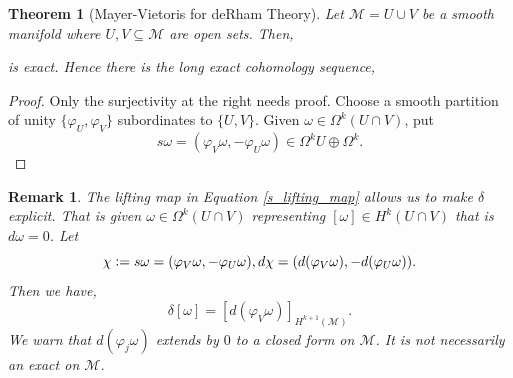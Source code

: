 \documentclass[8pt]{article}
\newtheorem{theorem}{Theorem} [section]
\newtheorem{remark}{Remark}[section]
\newcommand{\defeq}{\vcentcolon=}
\newcommand{\M}[0]{\mathcal{M}}
\begin{document}
\begin{theorem}[Mayer-Vietoris for deRham Theory]
  Let $\M=U\cup V$ be a smooth manifold where $U,V\subseteq\M$ are open sets. Then,
  \begin{center}
  \end{center}
  is exact.
  Hence there is the long exact cohomology sequence, 
  \begin{center}
  \end{center}
\end{theorem}

\begin{proof}
  Only the surjectivity at the right needs proof. Choose a smooth partition of unity $\{\varphi_U,\varphi_V\}$ subordinates to $\{U,V\}$. Given $\omega\in\Omega^k(U\cap V)$, put 
  \begin{equation*}
    s\omega = (\varphi_V\omega,-\varphi_U\omega)\in\Omega^k U\oplus \Omega^k.\tag{$\ast$}\label{s_lifting_map}
  \end{equation*}
\end{proof}

\begin{remark}
  The lifting map in Equation \eqref{s_lifting_map} allows us to make $\delta$ explicit. That is given $\omega\in\Omega^k(U\cap V)$ representing $[\omega]\in H^k(U\cap V)$ that is $d\omega = 0$. Let 
  \begin{equation*}
    \chi\defeq s\omega = (\varphi_V\omega,-\varphi_U\omega),d\chi=(d(\varphi_V\omega),-d(\varphi_U\omega)).
  \end{equation*}
  Then we have,
  \begin{equation*}
    \delta[\omega]=[d(\varphi_V\omega)]_{H^{k+1}(\M)}.
  \end{equation*}
  We warn that $d(\varphi_j\omega)$ extends by $0$ to a closed form on $\M$. It is not necessarily an exact on $\M$.
\end{remark}
\end{document}
